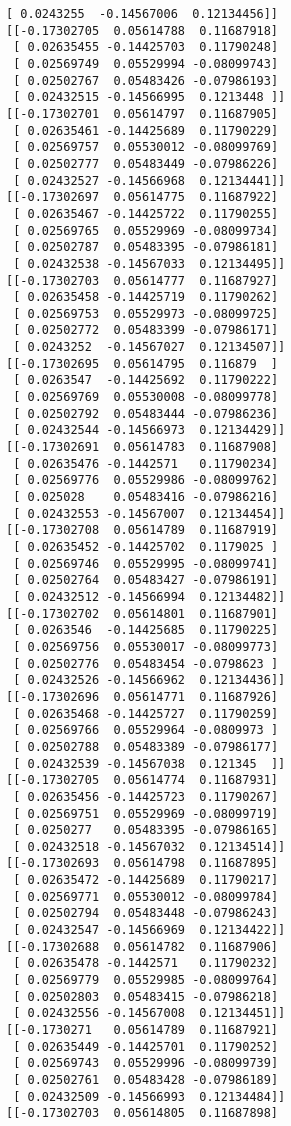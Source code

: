 \documentclass[11pt]{article}
\begin{document}
\begin{Verbatim}[commandchars=\\\{\}]
 [ 0.0243255  -0.14567006  0.12134456]]
[[-0.17302705  0.05614788  0.11687918]
 [ 0.02635455 -0.14425703  0.11790248]
 [ 0.02569749  0.05529994 -0.08099743]
 [ 0.02502767  0.05483426 -0.07986193]
 [ 0.02432515 -0.14566995  0.1213448 ]]
[[-0.17302701  0.05614797  0.11687905]
 [ 0.02635461 -0.14425689  0.11790229]
 [ 0.02569757  0.05530012 -0.08099769]
 [ 0.02502777  0.05483449 -0.07986226]
 [ 0.02432527 -0.14566968  0.12134441]]
[[-0.17302697  0.05614775  0.11687922]
 [ 0.02635467 -0.14425722  0.11790255]
 [ 0.02569765  0.05529969 -0.08099734]
 [ 0.02502787  0.05483395 -0.07986181]
 [ 0.02432538 -0.14567033  0.12134495]]
[[-0.17302703  0.05614777  0.11687927]
 [ 0.02635458 -0.14425719  0.11790262]
 [ 0.02569753  0.05529973 -0.08099725]
 [ 0.02502772  0.05483399 -0.07986171]
 [ 0.0243252  -0.14567027  0.12134507]]
[[-0.17302695  0.05614795  0.116879  ]
 [ 0.0263547  -0.14425692  0.11790222]
 [ 0.02569769  0.05530008 -0.08099778]
 [ 0.02502792  0.05483444 -0.07986236]
 [ 0.02432544 -0.14566973  0.12134429]]
[[-0.17302691  0.05614783  0.11687908]
 [ 0.02635476 -0.1442571   0.11790234]
 [ 0.02569776  0.05529986 -0.08099762]
 [ 0.025028    0.05483416 -0.07986216]
 [ 0.02432553 -0.14567007  0.12134454]]
[[-0.17302708  0.05614789  0.11687919]
 [ 0.02635452 -0.14425702  0.1179025 ]
 [ 0.02569746  0.05529995 -0.08099741]
 [ 0.02502764  0.05483427 -0.07986191]
 [ 0.02432512 -0.14566994  0.12134482]]
[[-0.17302702  0.05614801  0.11687901]
 [ 0.0263546  -0.14425685  0.11790225]
 [ 0.02569756  0.05530017 -0.08099773]
 [ 0.02502776  0.05483454 -0.0798623 ]
 [ 0.02432526 -0.14566962  0.12134436]]
[[-0.17302696  0.05614771  0.11687926]
 [ 0.02635468 -0.14425727  0.11790259]
 [ 0.02569766  0.05529964 -0.0809973 ]
 [ 0.02502788  0.05483389 -0.07986177]
 [ 0.02432539 -0.14567038  0.121345  ]]
[[-0.17302705  0.05614774  0.11687931]
 [ 0.02635456 -0.14425723  0.11790267]
 [ 0.02569751  0.05529969 -0.08099719]
 [ 0.0250277   0.05483395 -0.07986165]
 [ 0.02432518 -0.14567032  0.12134514]]
[[-0.17302693  0.05614798  0.11687895]
 [ 0.02635472 -0.14425689  0.11790217]
 [ 0.02569771  0.05530012 -0.08099784]
 [ 0.02502794  0.05483448 -0.07986243]
 [ 0.02432547 -0.14566969  0.12134422]]
[[-0.17302688  0.05614782  0.11687906]
 [ 0.02635478 -0.1442571   0.11790232]
 [ 0.02569779  0.05529985 -0.08099764]
 [ 0.02502803  0.05483415 -0.07986218]
 [ 0.02432556 -0.14567008  0.12134451]]
[[-0.1730271   0.05614789  0.11687921]
 [ 0.02635449 -0.14425701  0.11790252]
 [ 0.02569743  0.05529996 -0.08099739]
 [ 0.02502761  0.05483428 -0.07986189]
 [ 0.02432509 -0.14566993  0.12134484]]
[[-0.17302703  0.05614805  0.11687898]

\end{Verbatim}
\end{document}
